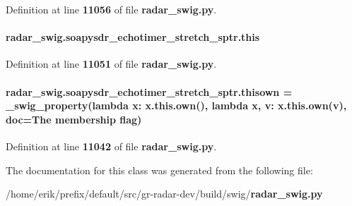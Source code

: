 Definition at line {\bf 11056} of file {\bf radar\+\_\+swig.\+py}.

\paragraph[{this}]{\setlength{\rightskip}{0pt plus 5cm}radar\+\_\+swig.\+soapysdr\+\_\+echotimer\+\_\+stretch\+\_\+sptr.\+this}\label{classradar__swig_1_1soapysdr__echotimer__stretch__sptr_a6fc34873f90832222bc3c527a87f5b24}


Definition at line {\bf 11051} of file {\bf radar\+\_\+swig.\+py}.

\paragraph[{thisown}]{\setlength{\rightskip}{0pt plus 5cm}radar\+\_\+swig.\+soapysdr\+\_\+echotimer\+\_\+stretch\+\_\+sptr.\+thisown = {\bf \+\_\+swig\+\_\+property}(lambda x\+: x.\+this.\+own(), lambda {\bf x}, v\+: x.\+this.\+own(v), doc=\textquotesingle{}The membership flag\textquotesingle{})\hspace{0.3cm}{\ttfamily [static]}}\label{classradar__swig_1_1soapysdr__echotimer__stretch__sptr_a436070d5c8502826712fb42fa1bad552}


Definition at line {\bf 11042} of file {\bf radar\+\_\+swig.\+py}.



The documentation for this class was generated from the following file\+:\begin{DoxyCompactItemize}
\item 
/home/erik/prefix/default/src/gr-\/radar-\/dev/build/swig/{\bf radar\+\_\+swig.\+py}\end{DoxyCompactItemize}
